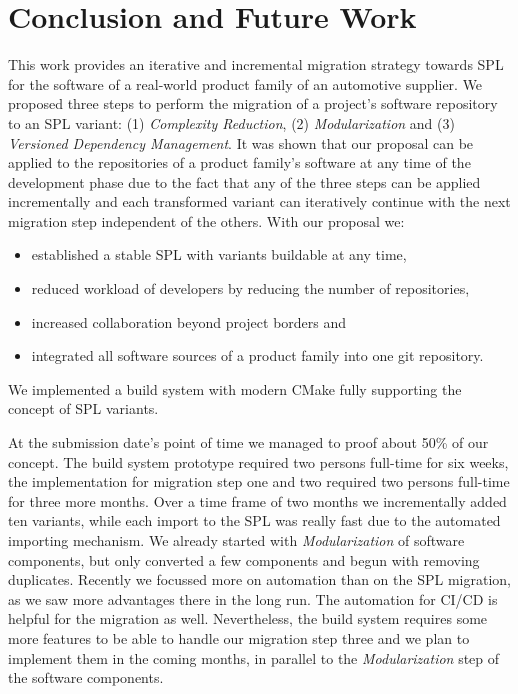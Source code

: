 \section{Conclusion and Future Work}\label{conclusion}

This work provides an iterative and incremental migration strategy towards SPL
for the software of a real-world product family of an automotive supplier. We
proposed three steps to perform the migration of a project's software repository
to an SPL variant: (1) \textit{Complexity Reduction}, (2)
\textit{Modularization} and (3) \textit{Versioned Dependency Management}. It was
shown that our proposal can be applied to the repositories of a product family's
software at any time of the development phase due to the fact that any of the
three steps can be applied incrementally and each transformed variant can
iteratively continue with the next migration step independent of the others.
With our proposal we:

\begin{itemize}
  \item established a stable SPL with variants buildable at any time,
  \item reduced workload of developers by reducing the number of repositories,
  \item increased collaboration beyond project borders and
  \item integrated all software sources of a product family into one git
        repository.
\end{itemize}

We implemented a build system with modern CMake fully supporting the concept of
SPL variants.

At the submission date's point of time we managed to proof about 50\% of our
concept. The build system prototype required two persons full-time for six
weeks, the implementation for migration step one and two required two persons
full-time for three more months. Over a time frame of two months we
incrementally added ten variants, while each import to the SPL was really fast
due to the automated importing mechanism. We already started with
\textit{Modularization} of software components, but only converted a few
components and begun with removing duplicates. Recently we focussed more on
automation than on the SPL migration, as we saw more advantages there in the
long run. The automation for CI/CD is helpful for the migration as well.
Nevertheless, the build system requires some more features to be able to handle
our migration step three and we plan to implement them in the coming months, in
parallel to the \textit{Modularization} step of the software components.


